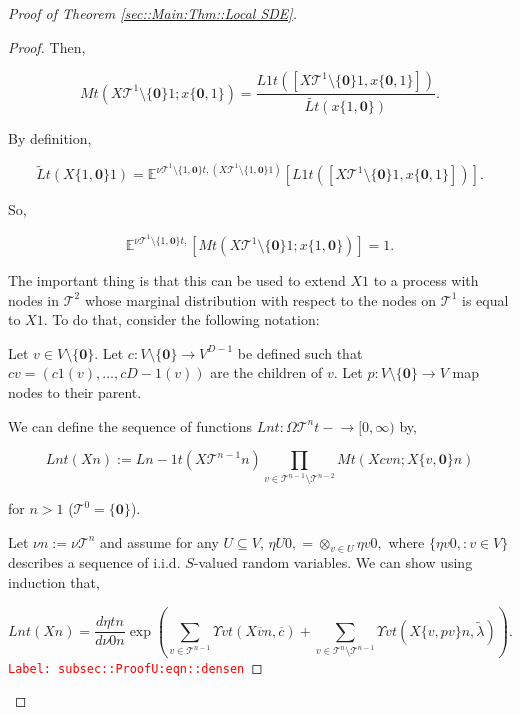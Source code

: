 \documentclass[12pt]{article}
\newcommand{\mb}{\mathbb}
\newcommand{\mc}{\mathcal}
\newcommand{\ra}{\rightarrow}
\newcommand{\ov}{\overline}
\newcommand{\tr}{\textcolor{red}}
\newcommand{\labe}[1]{\tr{\texttt{Label: #1}}}
\newcommand{\ind}{\hspace{24pt}}
\newcommand{\exmu}[2]{\mb{E}^{#1}\left[#2\right]}	%
\newcommand{\defeq}{:=}								%
\renewcommand{\root}{\mathbf{0}}				%
\renewcommand{\v}{v}							%
\renewcommand{\U}{U}							%
\renewcommand{\S}{S}							%
\newcommand{\x}{x}								%
\renewcommand{\t}{t}							%
\newcommand{\X}{X}								%
\newcommand{\cl}{\ov}							%
\newcommand{\degr}{D}							%
\newcommand{\IGrg}{\ov{c}}						%
\newcommand{\tree}{\mc{T}}						%
\newcommand{\sln}[1]{^{#1}}						%
\newcommand{\alt}[1]{\widetilde{#1}}			%
\newcommand{\mm}{\nu}							%
\newcommand{\mmm}{\eta}							%
\newcommand{\crate}{\alt{\lambda}}				%
\newcommand{\dense}{L}							%
\newcommand{\cdense}{M}							%
\newcommand{\ds}{\Upsilon}						%
\renewcommand{\c}{c}							%
\newcommand{\p}{p}								%
\begin{document}
\begin{proof}[Proof of Theorem \ref{sec::Main:Thm::Local SDE}]
\begin{proof}
Then,

\[\cdense{}{\t}(\X{\tree\sln{1}\setminus\{\root\}}{}{1};\x{\{\root,1\}}{}) = \frac{\dense{1}{\t}([\X{\tree\sln{1}\setminus\{\root\}}{}{1},\x{\{\root,1\}}{}])}{\alt{\dense{}{\t}}(\x{\{1,\root\}}{})}.\]

By definition,

\[\alt{\dense}{}{\t}(\X{\{1,\root\}}{}{1}) = \exmu{\mm{\tree\sln{1}\setminus\{1,\root\}}{\t,}{}(\X{\tree\sln{1}\setminus\{1,\root\}}{}{1})}{\dense{1}{\t}([\X{\tree\sln{1}\setminus\{\root\}}{}{1},\x{\{\root,1\}}{}])}.\]

So,

\[\exmu{\mm{\tree\sln{1}\setminus\{1,\root\}}{\t,}{}}{\cdense{}{\t}(\X{\tree\sln{1}\setminus\{\root\}}{}{1};\x{\{1,\root\}}{})} = 1.\]

The important thing is that this can be used to extend \(\X{}{}{1}\) to a process with nodes in \(\tree\sln{2}\) whose marginal distribution with respect to the nodes on \(\tree\sln{1}\) is equal to \(\X{}{}{1}\). To do that, consider the following notation:

\ind Let \(\v \in V\setminus\{\root\}\). Let \(\c{}:V\setminus\{\root\} \ra V^{\degr-1}\) be defined such that \(\c{\v} = (\c{1}(\v),\dots,\c{\degr-1}(\v))\) are the children of \(\v\). Let \(\p{}:V\setminus\{\root\}\ra V\) map nodes to their parent.

\ind We can define the sequence of functions \(\dense{n}{\t}: \Omega{\tree\sln{n}}{\t-} \ra [0,\infty)\) by,

\[\dense{n}{\t}(\X{}{}{n}) := \dense{n-1}{\t}(\X{\tree\sln{n-1}}{}{n})\prod_{\v\in \tree\sln{n-1}\setminus\tree\sln{n-2}} \cdense{}{\t}(\X{\c{\v}}{}{n};\X{\{\v,\root\}}{}{n})\]

for \(n > 1\) (\(\tree\sln{0} = \{\root\}\)). 

\ind Let \(\mm{}{}{n}\defeq \mm{\tree\sln{n}}{}{}\) and assume for any \(\U \subseteq V\), \(\mmm{\U}{0,}{} = \otimes_{\v\in\U}\mmm{\v}{0,}{}\) where \(\{\mmm{\v}{0,}{}:\v\in V\}\) describes a sequence of i.i.d. \(\S\)-valued random variables. We can show using induction that,

\begin{equation}
\dense{n}{\t}(\X{}{}{n}) = \frac{d\mmm{}{\t}{n}}{d\mm{}{0}{n}}\exp\left(\sum_{\v\in\tree\sln{n-1}}\ds{\v}{\t}(\X{\cl{\v}}{}{n},\IGrg{}) + \sum_{\v\in\tree\sln{n}\setminus\tree\sln{n-1}} \ds{\v}{\t}(\X{\{v,\p{\v}\}}{}{n},\crate{}{})\right).
\label{subsec::ProofU:eqn::densen}
\end{equation}
\labe{subsec::ProofU:eqn::densen}


\end{proof}
\end{proof}
\end{document}
